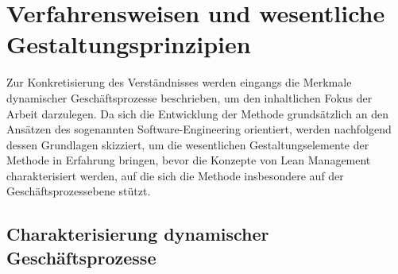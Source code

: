 \section{Verfahrensweisen und wesentliche Gestaltungsprinzipien}\label{sec:methodenGrundlage}
Zur Konkretisierung des Verständnisses werden eingangs die Merkmale dynamischer Geschäftsprozesse beschrieben, um den inhaltlichen Fokus der Arbeit darzulegen.
Da sich die Entwicklung der Methode grundsätzlich an den Ansätzen des sogenannten Software-Engineering orientiert, werden nachfolgend dessen Grundlagen skizziert, um die wesentlichen Gestaltungselemente der Methode in Erfahrung bringen, bevor die Konzepte von Lean Management charakterisiert werden, auf die sich die Methode insbesondere auf der Geschäftsprozessebene stützt.


\cite{Grauer.2010}

\subsection{Charakterisierung dynamischer Geschäftsprozesse}

